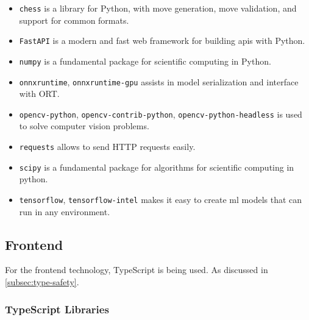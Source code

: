 \begin{itemize}
    \item \texttt{chess} is a library for Python, with move generation, move validation, and support for common formats. \cite{python:chess}
    
    \item \texttt{FastAPI} is a modern and fast web framework for building \Glspl{api} with Python. \cite{python:fastapi}
    
    \item \texttt{numpy} is a fundamental package for scientific computing in Python. \cite{python:numpy}
    
    \item \texttt{onnxruntime}, \texttt{onnxruntime-gpu} assists in model serialization and interface with ORT. \cite{python:onnx}
    
    \item \texttt{opencv-python}, \texttt{opencv-contrib-python}, \texttt{opencv-python-headless} is used to solve computer vision problems. \cite{python:opencv}
    
    \item \texttt{requests} allows to send HTTP requests easily. \cite{python:requests}
    
    \item \texttt{scipy} is a fundamental package for algorithms for scientific computing in python. \cite{python:scipy}
    
    \item \texttt{tensorflow}, \texttt{tensorflow-intel} makes it easy to create \gls{ml} models that can run in any environment. \cite{python:tensorflow}
\end{itemize}

\subsection{Frontend}

For the frontend technology, TypeScript is being used. As discussed in \ref{subsec:type-safety}.

\subsubsection*{TypeScript Libraries}

